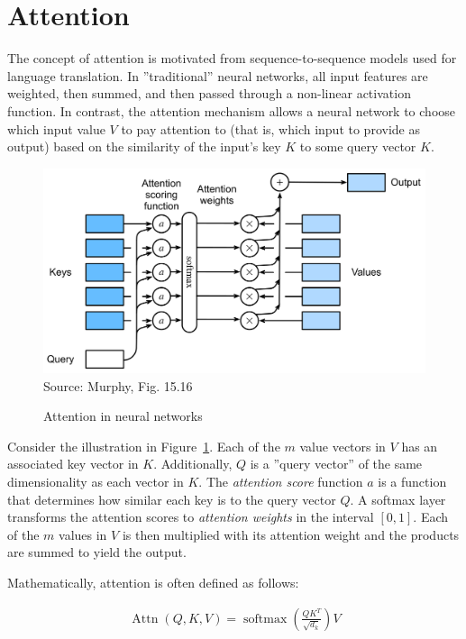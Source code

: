 \section{Attention}

The concept of attention is motivated from sequence-to-sequence models used for language translation. In ''traditional'' neural networks, all input features are weighted, then summed, and then passed through a non-linear activation function. In contrast, the attention mechanism allows a neural network to choose which input value $V$ to pay attention to (that is, which input to provide as output) based on the similarity of the input's key $K$ to some query vector $K$. 

\begin{figure}
\centering
\includegraphics[width=.8\textwidth]{murphy_15_16.png} \\

\scriptsize Source: Murphy, Fig. 15.16 \normalsize
\caption{Attention in neural networks}
\label{fig:murphy_15_16}
\end{figure}

Consider the illustration in Figure~\ref{fig:murphy_15_16}. Each of the $m$ value vectors in $V$ has an associated key vector in $K$. Additionally, $Q$ is a ''query vector'' of the same dimensionality as each vector in $K$. The \emph{attention score} function $a$ is a function that determines how similar each key is to the query vector $Q$. A softmax layer transforms the attention scores to \emph{attention weights} in the interval $[0, 1]$. Each of the $m$ values in $V$ is then multiplied with its attention weight and the products are summed to yield the output.  

Mathematically, attention is often defined as follows:

\begin{align*}
\operatorname{Attn}(Q, K, V) = \operatorname{softmax}\left(\frac{Q K^T}{\sqrt{d_k}} \right) V
\end{align*}

